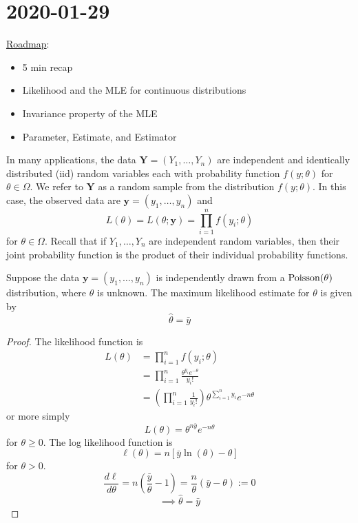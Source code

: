 \section{2020-01-29}
\underline{Roadmap}:
\begin{itemize}
    \item 5 min recap
    \item Likelihood and the MLE for continuous distributions
    \item Invariance property of the MLE
    \item Parameter, Estimate, and Estimator
\end{itemize}
\begin{defbox}
    \begin{definition}
        In many applications, the data $ \bm{Y}=(Y_1,\ldots ,Y_n) $ are independent
        and identically distributed (iid) random variables each with probability function
        $ f(y;\theta) $ for $ \theta\in\Omega $. We refer to $ \bm{Y} $
        as a random sample from the distribution $ f(y;\theta) $. In this case,
        the observed data are $ \bm{y}=(y_1,\ldots ,y_n) $ and
        \[ L(\theta)=L(\theta;\bm{y})=\prod_{i=1}^n f(y_i;\theta) \]
        for $ \theta\in\Omega $. Recall that if $ Y_1,\ldots ,Y_n $ are
        independent random variables, then their joint probability function is
        the product of their individual probability functions.
    \end{definition}
\end{defbox}

\begin{thmbox}
    \begin{prop}
        Suppose the data $ \bm{y}=(y_1,\ldots ,y_n) $ is independently
        drawn from a $ \operatorname{Poisson}(\theta) $ distribution, where $ \theta $ is unknown.
        The maximum likelihood estimate for $ \theta $ is given by
        \[ \hat{\theta}=\bar{y} \]
    \end{prop}
\end{thmbox}
\begin{proof}
    The likelihood function is
    \begin{align*}
        L(\theta) & =
        \prod_{i=1}^n f(y_i;\theta)                                     \\
                  & =\prod_{i=1}^n \frac{\theta^{y_i}e^{-\theta}}{y_i!} \\
                  & =\left( \prod_{i=1}^n  \frac{1}{y_i!} \right)
        \theta^{\sum\limits_{i=1}^{n} y_i}e^{-n\theta}
    \end{align*}
    or more simply
    \[ L(\theta)=\theta^{n\bar{y}}e^{-n\theta} \]
    for $ \theta\geqslant 0 $. The log likelihood function is
    \[ \ell(\theta)=n\left[ \bar{y}\ln(\theta)-\theta \right] \]
    for $ \theta>0 $.
    \[ \frac{d\ell}{d\theta} =n\left( \frac{\bar{y}}{\theta}-1 \right)=\frac{n}{\theta}
        \left( \bar{y}-\theta \right):=0 \]
    \[ \implies \hat{\theta}=\bar{y} \]
\end{proof}

